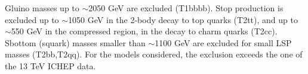 
\newpage
Gluino masses up to $\sim$2050 GeV are excluded (T1bbbb). Stop production is
excluded up to $\sim$1050 GeV in the 2-body decay to top quarks (T2tt), and up
to $\sim$550 GeV in the compressed region, in the decay to charm quarks (T2cc).
Sbottom (squark) masses smaller than $\sim$1100 GeV are excluded for small LSP
masses (T2bb,T2qq). For the models considered, the exclusion exceeds the one of
the 13 TeV ICHEP data.

